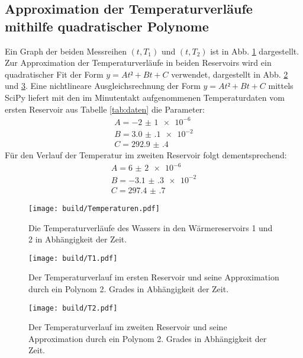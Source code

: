 \subsection{Approximation der Temperaturverläufe mithilfe quadratischer Polynome}
Ein Graph der beiden Messreihen $(t,T_1)$ und $(t,T_2)$ ist in Abb. \ref{fig:Graph2} dargestellt.
 Zur Approximation der Temperaturverläufe in beiden Reservoirs wird ein
 quadratischer Fit der Form $y = At²+Bt+C$ verwendet, dargestellt in Abb. \ref{fig:Graph3} und \ref{fig:Graph4}. Eine nichtlineare
 Ausgleichsrechnung der Form $y = At²+Bt+C$ mittels SciPy \cite{scipy} liefert mit den im Minutentakt
 aufgenommenen Temperaturdaten vom ersten Reservoir aus Tabelle \ref{tab:daten}
 die Parameter:
 \begin{displaymath}
\begin{aligned}
 A = \num{-2(1)e-6}\\
 B = \num{3.0(1)e-2}\\
 C = \num{292.9(4)}
 \end{aligned}
 \end{displaymath}
 Für den Verlauf der Temperatur im zweiten Reservoir folgt dementsprechend:
 \begin{displaymath}
\begin{aligned}
 A = \num{6(2)e-6}\\
 B = \num{-3.1(3)e-2}\\
 C = \num{297.4(7)}
 \end{aligned}
 \end{displaymath}
 \begin{figure}
 	\centering
 	\caption{Die Temperaturverläufe des Wassers in den Wärmereservoirs 1 und 2 in Abhängigkeit der Zeit.}
 	\texttt{[image: build/Temperaturen.pdf]}
 	\label{fig:Graph2}
 \end{figure}
 \begin{figure}
 	\centering
 	\caption{Der Temperaturverlauf im ersten Reservoir und seine Approximation durch ein Polynom 2. Grades in Abhängigkeit der Zeit.}
 	\texttt{[image: build/T1.pdf]}
 	\label{fig:Graph3}
 \end{figure}
 \begin{figure}
 	\centering
 	\caption{Der Temperaturverlauf im zweiten Reservoir und seine Approximation durch ein Polynom 2. Grades in Abhängigkeit der Zeit.}
 	\texttt{[image: build/T2.pdf]}
 	\label{fig:Graph4}
 \end{figure}


